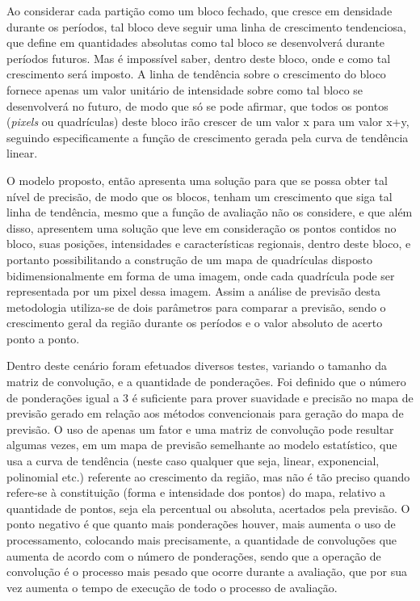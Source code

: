 Ao considerar cada partição como um bloco fechado, que cresce em densidade durante os períodos, tal bloco deve seguir uma linha de crescimento tendenciosa, que define em quantidades absolutas como tal bloco se desenvolverá durante períodos futuros. Mas é impossível saber, dentro deste bloco, onde e como tal crescimento será imposto. A linha de tendência sobre o crescimento do bloco fornece apenas um valor unitário de intensidade sobre como tal bloco se desenvolverá no futuro, de modo que só se pode afirmar, que todos os pontos (\emph{pixels} ou quadrículas) deste bloco irão crescer de um valor x para um valor x+y, seguindo especificamente a função de crescimento gerada pela curva de tendência linear. 

O modelo proposto, então apresenta uma solução para que se possa obter tal nível de precisão, de modo que os blocos, tenham um crescimento que siga tal linha de tendência, mesmo que a função de avaliação não os considere, e que além disso, apresentem uma solução que leve em consideração os pontos contidos no bloco, suas posições, intensidades e características regionais, dentro deste bloco, e portanto possibilitando a construção de um mapa de quadrículas disposto bidimensionalmente em forma de uma imagem, onde cada quadrícula pode ser representada por um pixel dessa imagem. Assim a análise de previsão desta metodologia utiliza-se de dois parâmetros para comparar a previsão, sendo o crescimento geral da região durante os períodos e o valor absoluto de acerto ponto a ponto.

Dentro deste cenário foram efetuados diversos testes, variando o tamanho da matriz de convolução, e a quantidade de ponderações. Foi definido que o número de ponderações igual a 3 é suficiente para prover suavidade e precisão no mapa de previsão gerado em relação aos métodos convencionais para geração do mapa de previsão. O uso de apenas um fator e uma matriz de convolução pode resultar algumas vezes, em um mapa de previsão semelhante ao modelo estatístico, que usa a curva de tendência (neste caso qualquer que seja, linear, exponencial, polinomial etc.) referente ao crescimento da região, mas não é tão preciso quando refere-se à constituição (forma e intensidade dos pontos) do mapa, relativo a quantidade de pontos, seja ela percentual ou absoluta, acertados pela previsão. O ponto negativo é que quanto mais ponderações houver, mais aumenta o uso de processamento, colocando mais precisamente, a quantidade de convoluções que aumenta de acordo com o número de ponderações, sendo que a operação de convolução é o processo mais pesado que ocorre durante a avaliação, que por sua vez aumenta o tempo de execução de todo o processo de avaliação.


